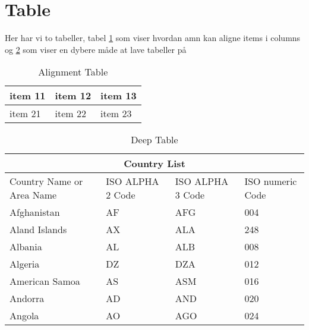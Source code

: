 \section{Table}

Her har vi to tabeller, tabel \ref{table:align} som viser hvordan amn kan aligne items i columns og \ref{table:deep} som viser en dybere måde at lave tabeller på

\begin{table}[ht]
    \centering
    \begin{tabularx}{0.8\textwidth} { 
        | >{\raggedright\arraybackslash}X 
        | >{\centering\arraybackslash}X 
        | >{\raggedleft\arraybackslash}X | }
       \hline
       item 11 & item 12 & item 13 \\
       \hline
       item 21  & item 22  & item 23  \\
      \hline
    \end{tabularx}
    \caption{Alignment Table}
    \label{table:align}
\end{table}

\begin{table}[ht]
    \centering
    \begin{tabular}{ |p{3.5cm}||p{3.5cm}|p{3.5cm}|p{3.5cm}|  }
        \hline
        \multicolumn{4}{|c|}{Country List} \\
        \hline
        Country Name or Area Name& ISO ALPHA 2 Code &ISO ALPHA 3 Code&ISO numeric Code\\
        \hline
        Afghanistan   & AF    &AFG&   004\\
        Aland Islands&   AX  & ALA   &248\\
        Albania &AL & ALB&  008\\
        Algeria    &DZ & DZA&  012\\
        American Samoa&   AS  & ASM&016\\
        Andorra& AD  & AND   &020\\
        Angola& AO  & AGO&024\\
        \hline
    \end{tabular}
    \caption{Deep Table}
    \label{table:deep}
\end{table}
